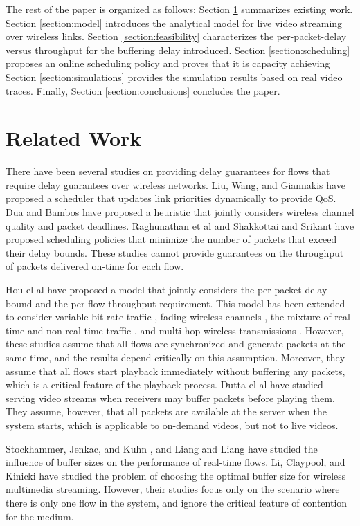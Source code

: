 \documentclass[10pt,nocopyrightspace]{sigplan-proc-varsize-1in}
\begin{document}
The rest of the paper is organized as follows: Section \ref{section:related} summarizes existing work. Section \ref{section:model} introduces the analytical model for live video streaming over wireless links. Section \ref{section:feasibility} characterizes the per-packet-delay versus throughput for the buffering delay introduced. Section \ref{section:scheduling} proposes an online scheduling policy and proves that it is capacity achieving Section \ref{section:simulations} provides the simulation results based on real video traces. Finally, Section \ref{section:conclusions} concludes the paper.

\section{Related Work}	\label{section:related}

There have been several studies on providing delay guarantees for flows that require delay guarantees over wireless networks. Liu, Wang, and Giannakis \cite{QL06} have proposed a scheduler that updates link priorities dynamically to provide QoS. Dua and Bambos \cite{AD07} have proposed a heuristic that jointly considers wireless channel quality and packet deadlines. Raghunathan et al \cite{VR08} and Shakkottai and Srikant \cite{SS02} have proposed scheduling policies that minimize the number of packets that exceed their delay bounds. These studies cannot provide guarantees on the throughput of packets delivered on-time for each flow.

Hou el al \cite{IH09} have proposed a model that jointly considers the per-packet delay bound and the per-flow throughput requirement. This model has been extended to consider variable-bit-rate traffic \cite{IH09Hoc}, fading wireless channels \cite{IH10}\cite{JJ11}, the mixture of real-time and non-real-time traffic \cite{JJ10}, and multi-hop wireless transmissions \cite{RL11}. However, these studies assume that all flows are synchronized and generate packets at the same time, and the results depend critically on this assumption. Moreover, they assume that all flows start playback immediately without buffering any packets, which is a critical feature of the playback process. Dutta el al \cite{PD12} have studied serving video streams when receivers may buffer packets before playing them. They assume, however, that all packets are available at the server when the system starts, which is applicable to on-demand videos, but not to live videos.

Stockhammer, Jenkac, and Kuhn \cite{TS04}, and Liang and Liang\cite{GL07}\cite{GL08} have studied the influence of buffer sizes on the performance of real-time flows. Li, Claypool, and Kinicki \cite{ML09} have studied the problem of choosing the optimal buffer size for wireless multimedia streaming. However, their studies focus only on the scenario where there is only one flow in the system, and ignore the critical feature of contention for the medium.
\end{document}
